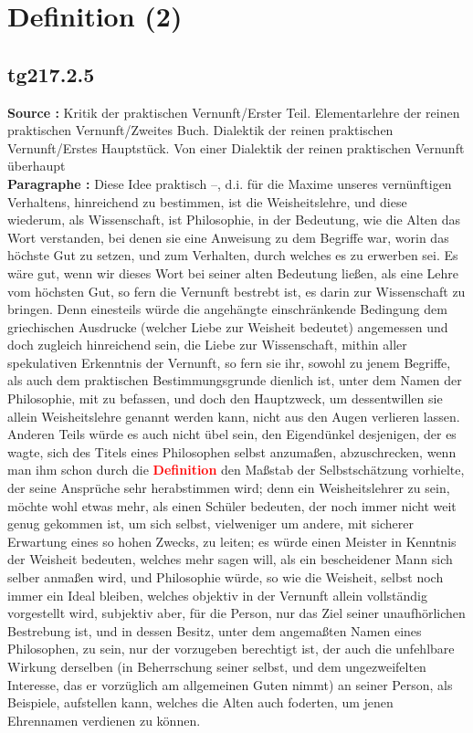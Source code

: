 \documentclass[a4paper,12pt,twoside]{book}
\newcommand{\match}[1]{\textcolor{red}{\textbf{#1}}}
\newcommand{\unnumberedsection}[1]{
	\section*{#1}
	\addcontentsline{toc}{section}{#1}
	\markright{#1}
}
\begin{document}
	\unnumberedsection{Definition (2)} 
	\subsection*{tg217.2.5} 
	\textbf{Source : }Kritik der praktischen Vernunft/Erster Teil. Elementarlehre der reinen praktischen Vernunft/Zweites Buch. Dialektik der reinen praktischen Vernunft/Erstes Hauptstück. Von einer Dialektik der reinen praktischen Vernunft überhaupt\\  
	
	\noindent\textbf{Paragraphe : }Diese Idee praktisch –, d.i. für die Maxime unseres vernünftigen Verhaltens, hinreichend zu bestimmen, ist die 
	Weisheitslehre, und diese wiederum, als Wissenschaft, ist Philosophie, in der Bedeutung, wie die Alten das Wort verstanden, bei denen sie eine Anweisung zu dem Begriffe war, worin das höchste Gut zu setzen, und zum Verhalten, durch welches es zu erwerben sei. Es wäre gut, wenn wir dieses Wort bei seiner alten Bedeutung ließen, als eine Lehre vom höchsten Gut, so fern die Vernunft bestrebt ist, es darin zur Wissenschaft zu bringen. Denn einesteils würde die angehängte einschränkende Bedingung dem griechischen Ausdrucke (welcher Liebe zur Weisheit bedeutet) angemessen und doch zugleich hinreichend sein, die Liebe zur Wissenschaft, mithin aller spekulativen Erkenntnis der Vernunft, so fern sie ihr, sowohl zu jenem Begriffe, als auch dem praktischen Bestimmungsgrunde dienlich ist, unter dem Namen der Philosophie, mit zu befassen, und doch den Hauptzweck, um dessentwillen sie allein Weisheitslehre genannt werden kann, nicht aus den Augen verlieren lassen. Anderen Teils würde es auch nicht übel sein, den Eigendünkel desjenigen, der es wagte, sich des Titels eines Philosophen selbst anzumaßen, abzuschrecken, wenn man ihm schon durch die \match{Definition} den Maßstab der Selbstschätzung vorhielte, der seine Ansprüche sehr herabstimmen wird; denn ein Weisheitslehrer zu sein, möchte wohl etwas mehr, als einen Schüler bedeuten, der noch immer nicht weit genug gekommen ist, um sich selbst, vielweniger um andere, mit sicherer Erwartung eines so hohen Zwecks, zu leiten; es würde einen Meister in Kenntnis der Weisheit bedeuten, welches mehr sagen will, als ein bescheidener Mann sich selber anmaßen wird, und Philosophie würde, so wie die Weisheit, selbst noch immer ein Ideal bleiben, welches objektiv in der Vernunft allein vollständig vorgestellt wird, subjektiv aber, für die Person, nur das Ziel seiner unaufhörlichen Bestrebung ist, und in dessen Besitz, unter dem angemaßten Namen eines Philosophen, zu sein, nur der vorzugeben berechtigt ist, der auch die unfehlbare Wirkung derselben (in Beherrschung seiner selbst, und dem ungezweifelten Interesse, das er vorzüglich am allgemeinen Guten nimmt) an seiner Person, als Beispiele, aufstellen kann, welches die Alten auch foderten, um jenen Ehrennamen verdienen zu können. 
	
\end{document}
